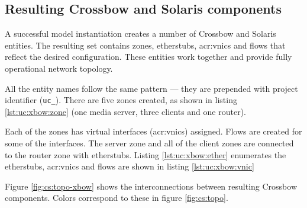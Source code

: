 \documentclass[11pt]{book}
\begin{document}
      
      
      \subsection{Resulting Crossbow and Solaris components}
      \label{sub:uc:xbow}

        A successful model instantiation creates a number of Crossbow and Solaris entities. The resulting set contains
        zones, etherstubs, \gls{acr:vnic}s and flows that reflect the desired configuration. These entities work together and
        provide fully operational network topology.

        All the entity names follow the same pattern --- they are prepended with project identifier (\texttt{uc\_}).
        There are five zones created, as shown in listing \ref{lst:uc:xbow:zone} (one media server, three clients and
        one router). \\

        \noindent
        \begin{minipage}{\textwidth}
          
        \end{minipage}

        Each of the zones has virtual interfaces (\gls{acr:vnic}s) assigned. Flows are created for some of the interfaces. The
        server zone and all of the client zones are connected to the router zone with etherstubs. Listing
        \ref{lst:uc:xbow:ether} enumerates the etherstubs, \gls{acr:vnic}s and flows are shown in listing \ref{lst:uc:xbow:vnic} \\

        \noindent
        \begin{minipage}{\textwidth}
          
        \end{minipage}

        \noindent
        \begin{minipage}{\textwidth}
          
        \end{minipage}

        Figure \ref{fig:cs:topo-xbow} shows the interconnections between resulting Crossbow components. Colors
        correspond to these in figure \ref{fig:cs:topo}.
\end{document}
